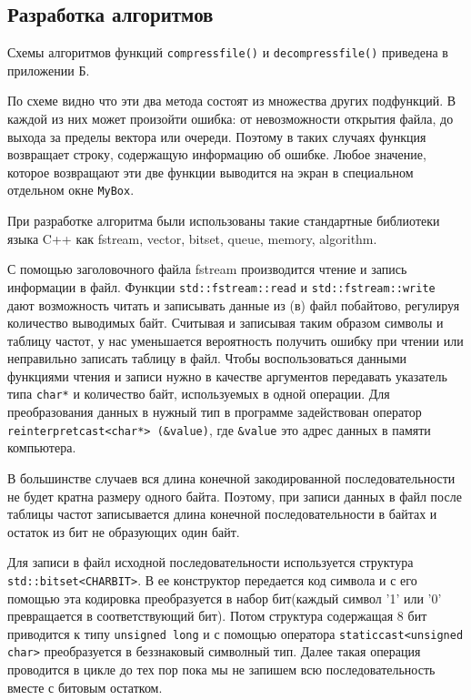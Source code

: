 \subsection{Разработка алгоритмов}


Схемы алгоритмов функций \texttt{compress{\textunderscore}file()} и \texttt{decompress{\textunderscore}file()} приведена в приложении Б.



По схеме видно что эти два метода состоят из множества других подфункций.
В каждой из них может произойти ошибка: от невозможности открытия файла, до выхода за пределы вектора или очереди.
Поэтому в таких случаях функция возвращает строку, содержащую информацию об ошибке.
Любое значение, которое возвращают эти две функции выводится на экран в специальном отдельном окне \texttt{MyBox}.



При разработке алгоритма были использованы такие стандартные библиотеки языка C++ как fstream, vector, bitset, queue, memory, algorithm.



С помощью заголовочного файла fstream производится чтение и запись информации в файл. 
Функции \texttt{std::fstream::read} и \texttt{std::fstream::write} дают возможность читать и записывать данные из (в) файл побайтово, регулируя количество выводимых байт.
Считывая и записывая таким образом символы и таблицу частот, у нас уменьшается вероятность получить ошибку при чтении или неправильно записать таблицу в файл.
Чтобы воспользоваться данными функциями чтения и записи нужно в качестве аргументов передавать указатель типа \texttt{char*} и количество байт, используемых в одной операции.
Для преобразования данных в нужный тип в программе задействован оператор \texttt{reinterpret{\textunderscore}cast<char*> (\&value)}, где \texttt{\&value} это адрес данных в памяти компьютера.



В большинстве случаев вся длина конечной закодированной последовательности не будет кратна размеру одного байта.
Поэтому, при записи данных в файл после таблицы частот записывается длина конечной последовательности в байтах и остаток из бит не образующих один байт.



Для записи в файл исходной последовательности используется структура \texttt{std::bitset<CHAR{\textunderscore}BIT>}.
В ее конструктор передается код символа и с его помощью эта кодировка преобразуется в набор бит(каждый символ '1' или '0' превращается в соответствующий бит).
Потом структура содержащая 8 бит приводится к типу \texttt{unsigned long} и с помощью оператора \texttt{static{\textunderscore}cast<unsigned char>} преобразуется в беззнаковый символный тип.
Далее такая операция проводится в цикле до тех пор пока мы не запишем всю последовательность вместе с битовым остатком.



